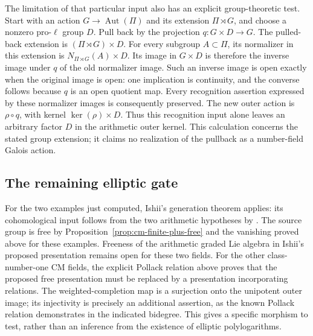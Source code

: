 \documentclass[11pt]{article}
\theoremstyle{definition}\newtheorem{definition}[theorem]{Definition}
\begin{document}
The limitation of that particular input also has an explicit
group-theoretic test. Start with an action \(G\to\operatorname{Aut}(\Pi)\)
and its extension \(\Pi\rtimes G\), and choose a nonzero pro-\(\ell\)
group \(D\). Pull back by the projection
\(q:G\times D\to G\). The pulled-back extension is
\((\Pi\rtimes G)\times D\). For every subgroup \(A\subset\Pi\),
its normalizer in this extension is
\(N_{\Pi\rtimes G}(A)\times D\). Its image in \(G\times D\)
is therefore the inverse image under \(q\) of the old normalizer
image. Such an inverse image is open exactly when the original
image is open: one implication is continuity, and the converse
follows because \(q\) is an open quotient map. Every recognition
assertion expressed by these normalizer images is consequently
preserved. The new outer action is \(\rho\circ q\), with kernel
\(\ker(\rho)\times D\). Thus this recognition input alone leaves
an arbitrary factor \(D\) in the arithmetic outer kernel.
This calculation concerns the stated group extension; it claims
no realization of the pullback as a number-field Galois action.

\subsection{The remaining elliptic gate}

For the two examples just computed, Ishii's generation theorem
applies: its cohomological input follows from the two arithmetic
hypotheses by \cite[Lemma 1.5, p.~3]{IshiiLie}.
The source group is free by Proposition~\ref{prop:cm-finite-plus-free}
and the vanishing proved above for these examples. Freeness of the
arithmetic graded Lie algebra in Ishii's proposed presentation remains
open for these two fields.
For the other class-number-one CM fields, the explicit Pollack
relation above proves that the proposed free presentation must
be replaced by a presentation incorporating relations.
The weighted-completion map is a surjection onto the unipotent
outer image; its injectivity is precisely an additional assertion,
as the known Pollack relation demonstrates in the indicated
bidegree. This gives a specific morphism to test, rather than
an inference from the existence of elliptic polylogarithms.
\end{document}
